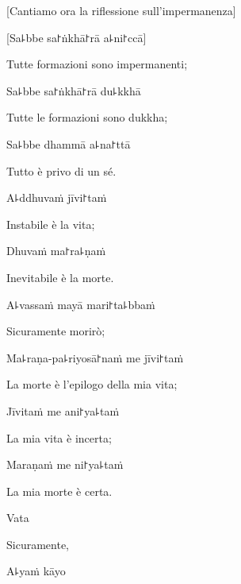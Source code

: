 \begin{english}
  [Cantiamo ora la riflessione sull'impermanenza]
\end{english}

[Sa꜕bbe sa꜓ṅkhā꜓rā a꜕ni꜓ccā]

\begin{english}
Tutte formazioni sono impermanenti;
\end{english}

Sa꜕bbe sa꜓ṅkhā꜓rā du꜕kkhā

\begin{english}
Tutte le formazioni sono dukkha;
\end{english}

Sa꜕bbe dhammā a꜕na꜓ttā

\begin{english}
Tutto è privo di un sé.
\end{english}

A꜕ddhuvaṁ jīvi꜓taṁ

\begin{english}
Instabile è la vita;
\end{english}

Dhuvaṁ ma꜓ra꜕ṇaṁ

\begin{english}
Inevitabile è la morte.
\end{english}

A꜕vassaṁ mayā mari꜓ta꜕bbaṁ

\begin{english}
Sicuramente morirò;
\end{english}

Ma꜕raṇa-pa꜕riyosā꜓naṁ me jīvi꜓taṁ

\begin{english}
La morte è l'epilogo della mia vita;
\end{english}

Jīvitaṁ me ani꜓ya꜕taṁ

\begin{english}
La mia vita è incerta;
\end{english}

Maraṇaṁ me ni꜓ya꜕taṁ

\begin{english}
La mia morte è certa.
\end{english}

Vata

\begin{english}
Sicuramente,
\end{english}

A꜕yaṁ kāyo

